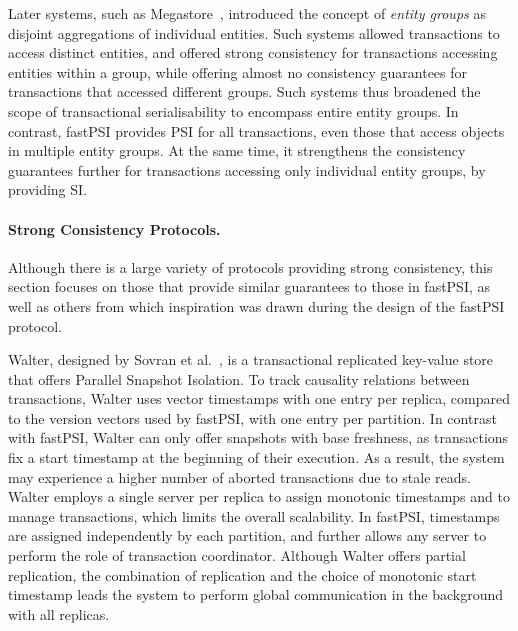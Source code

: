 Later systems, such as Megastore~\citep{baker_megastore}, introduced the concept of \emph{entity groups} as disjoint aggregations of individual entities. Such systems allowed transactions to access distinct entities, and offered strong consistency for transactions accessing entities within a group, while offering almost no consistency guarantees for transactions that accessed different groups. Such systems thus broadened the scope of transactional serialisability to encompass entire entity groups. In contrast, fastPSI provides PSI for all transactions, even those that access objects in multiple entity groups. At the same time, it strengthens the consistency guarantees further for transactions accessing only individual entity groups, by providing SI.

\paragraph{Strong Consistency Protocols.} Although there is a large variety of protocols providing strong consistency, this section focuses on those that provide similar guarantees to those in fastPSI, as well as others from which inspiration was drawn during the design of the fastPSI protocol.


Walter, designed by Sovran et al.~\citep{psi-intro}, is a transactional replicated key-value store that offers Parallel Snapshot Isolation. To track causality relations between transactions, Walter uses vector timestamps with one entry per replica, compared to the version vectors used by fastPSI, with one entry per partition. In contrast with fastPSI, Walter can only offer snapshots with base freshness, as transactions fix a start timestamp at the beginning of their execution. As a result, the system may experience a higher number of aborted transactions due to stale reads. Walter employs a single server per replica to assign monotonic timestamps and to manage transactions, which limits the overall scalability. In fastPSI, timestamps are assigned independently by each partition, and further allows any server to perform the role of transaction coordinator. Although Walter offers partial replication, the combination of replication and the choice of monotonic start timestamp leads the system to perform global communication in the background with all replicas.

